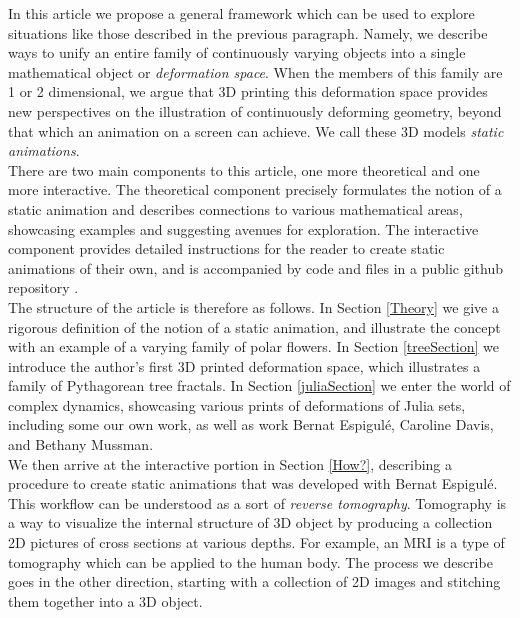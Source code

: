 \documentclass[12 pt]{article}
\begin{document}
In this article we propose a general framework which can be used to explore situations like those described in the previous paragraph.  Namely, we describe ways to unify an entire family of continuously varying objects into a single mathematical object or \textit{deformation space}.  When the members of this family are 1 or 2 dimensional, we argue that 3D printing this deformation space provides new perspectives on the illustration of continuously deforming geometry, beyond that which an animation on a screen can achieve.  We call these 3D models \textit{static animations}.\\

There are two main components to this article, one more theoretical and one more interactive.  The theoretical component precisely formulates the notion of a static animation and describes connections to various mathematical areas, showcasing examples and suggesting avenues for exploration.  The interactive component provides detailed instructions for the reader to create static animations of their own, and is accompanied by code and files in a public github repository \cite{github}.\\

The structure of the article is therefore as follows.  In Section \ref{Theory} we give a rigorous definition of the notion of a static animation, and illustrate the concept with an example of a varying family of polar flowers.  In Section \ref{treeSection} we introduce the author's first 3D printed deformation space, which illustrates a family of Pythagorean tree fractals.  In Section \ref{juliaSection} we enter the world of complex dynamics, showcasing various prints of deformations of Julia sets, including some our own work, as well as work Bernat Espigul\'e, Caroline Davis, and Bethany Mussman.\\

We then arrive at the interactive portion in Section \ref{How?}, describing a procedure to create static animations that was developed with Bernat Espigul\'e.  This workflow can be understood as a sort of \textit{reverse tomography}.  Tomography is a way to visualize the internal structure of 3D object by producing a collection 2D pictures of cross sections at various depths.  For example, an MRI is a type of tomography which can be applied to the human body.  The process we describe goes in the other direction, starting with a collection of 2D images and stitching them together into a 3D object.\\
\end{document}
